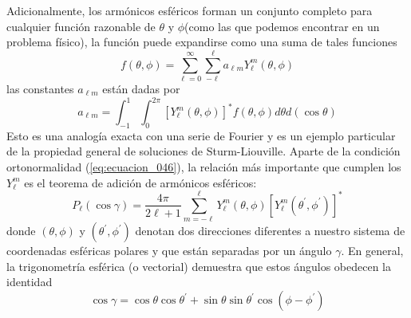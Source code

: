 Adicionalmente, los armónicos esféricos forman un conjunto completo para cualquier función razonable de $\theta$ y $\phi$(como las que podemos encontrar en un problema físico), la función puede expandirse como una suma de tales funciones
\begin{equation}
f(\theta, \phi) = \sum_{\ell=0}^{\infty} \sum_{-\ell}^{\ell} a_{\ell m} Y_{\ell}^{m} (\theta, \phi)
\label{eq:ecuacion_047}
\end{equation}
las constantes $a_{\ell m}$ están dadas por
\begin{equation}
a_{\ell m} = \int_{-1}^{1} \int_{0}^{2 \pi} [ Y_{\ell}^{m} (\theta, \phi) ]^{*} f (\theta, \phi) d \theta d (\cos \theta)
\label{eq:ecuacion_048}
\end{equation}
Esto es una analogía exacta con una serie de Fourier y es un ejemplo particular de la propiedad general de soluciones de Sturm-Liouville. Aparte de la condición ortonormalidad (\ref{eq:ecuacion_046}), la relación más importante que cumplen los $Y_{\ell}^{m}$ es el teorema de adición de armónicos esféricos:
\begin{equation}
P_{\ell} (\cos \gamma) = \dfrac{4 \pi}{2 \ell + 1} \sum_{m = -\ell}^{\ell} Y_{\ell}^{m} (\theta, \phi) [ Y_{\ell}^{m} (\theta^{\prime}, \phi^{\prime}) ]^{*}
\end{equation}
donde $(\theta, \phi)$ y $(\theta^{\prime}, \phi^{\prime})$ denotan dos direcciones diferentes a nuestro sistema de coordenadas esféricas polares y que están separadas por un ángulo $\gamma$. En general, la trigonometría esférica (o vectorial) demuestra que estos ángulos obedecen la identidad
\begin{equation}
\cos \gamma = \cos \theta \cos \theta^{\prime} + \sin \theta \sin \theta^{\prime} \cos (\phi - \phi^{\prime})
\label{eq:ecuacion_050}
\end{equation}
